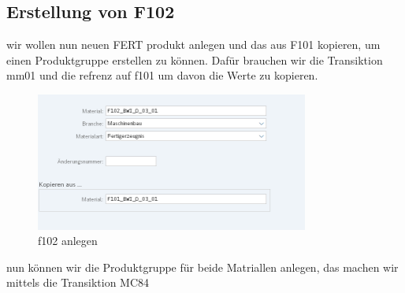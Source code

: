 \documentclass{article}
\begin{document}
 \subsection{Erstellung von F102}
wir wollen nun neuen FERT produkt anlegen und das aus F101 kopieren, um einen Produktgruppe erstellen zu können.
Dafür brauchen wir die Transiktion mm01 und die refrenz auf f101 um davon die Werte zu kopieren.
\begin{figure}[H]
\vspace{-10pt}
  \centering
  \includegraphics[width=0.8\textwidth]{f102.png}
  \caption{f102 anlegen}
  \label{fig:image}
\end{figure}
nun können wir die Produktgruppe für beide Matriallen anlegen, das machen wir mittels die Transiktion MC84
\end{document}
